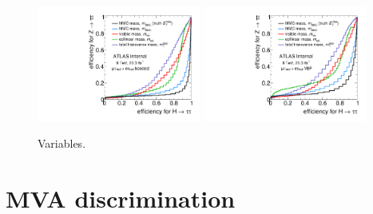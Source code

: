 \begin{figure}[tp]
  \centering
  \includegraphics[width=0.48\textwidth]{figures/mtautau/mtautau-ROC-boost}
  \includegraphics[width=0.48\textwidth]{figures/mtautau/mtautau-ROC-vbf}
  \caption{Variables.}
  \label{fig:strategy-mtautau-ROC}
\end{figure}

\section{MVA discrimination}
\label{sec:strategy-mva}

